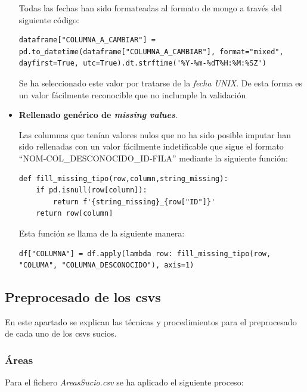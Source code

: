 \documentclass[]{article}
\begin{document}
\begin{itemize}
    Todas las fechas han sido formateadas al formato de mongo a través del siguiente código:

    \begin{lstlisting}[caption=Formateo de fechas"]
dataframe["COLUMNA_A_CAMBIAR"] = pd.to_datetime(dataframe["COLUMNA_A_CAMBIAR"], format="mixed", dayfirst=True, utc=True).dt.strftime('%Y-%m-%dT%H:%M:%SZ')
    \end{lstlisting}

    Se ha seleccionado este valor por tratarse de la \textit{fecha UNIX}. De
    esta forma es un valor fácilmente reconocible que no inclumple la validación
    \item \textbf{Rellenado genérico de \textit{missing values}}. 
    
    Las columnas que tenían valores nulos que no ha sido posible imputar han sido rellenadas con un valor fácilmente indetificable que sigue el formato ``NOM-COL\_DESCONOCIDO\_ID-FILA'' mediante la siguiente función:

    \begin{lstlisting}[caption=Inputacion de valores faltantes desconocidos]
def fill_missing_tipo(row,column,string_missing):
    if pd.isnull(row[column]):
        return f'{string_missing}_{row["ID"]}'
    return row[column]
    \end{lstlisting}

    Esta función se llama de la siguiente manera:

    \begin{lstlisting}[caption=llamada a la función para rellenar valores faltantes]
df["COLUMNA"] = df.apply(lambda row: fill_missing_tipo(row, "COLUMA", "COLUMNA_DESCONOCIDO"), axis=1)
    \end{lstlisting}

\end{itemize}

\subsection{Preprocesado de los csvs}
\label{subsec:preprocessespecifico}
En este apartado se explican las técnicas y procedimientos para el preprocesado de cada uno de los csvs sucios.

\subsubsection{Áreas}
\label{subsubsec:preprocessarea}
Para el fichero \textit{AreasSucio.csv} se ha aplicado el siguiente proceso:
\end{document}
